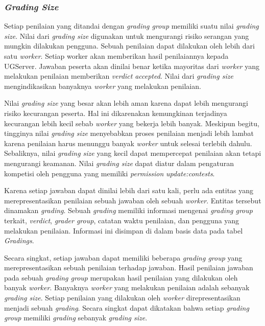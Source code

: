 \subsubsection{\textit{Grading Size}}

\par Setiap penilaian yang ditandai dengan \textit{grading group} memiliki suatu nilai \textit{grading size}. Nilai dari \textit{grading size} digunakan untuk mengurangi risiko serangan yang mungkin dilakukan pengguna. Sebuah penilaian dapat dilakukan oleh lebih dari satu \textit{worker}. Setiap worker akan memberikan hasil penilaiannya kepada UGServer. Jawaban peserta akan dinilai benar ketika mayoritas dari \textit{worker} yang melakukan penilaian memberikan \textit{verdict} \textit{accepted}. Nilai dari \textit{grading size} mengindikasikan banyaknya \textit{worker} yang melakukan penilaian.

\par Nilai \textit{grading size} yang besar akan lebih aman karena dapat lebih mengurangi risiko kecurangan peserta. Hal ini dikarenakan kemungkinan terjadinya kecurangan lebih kecil sebab \textit{worker} yang bekerja lebih banyak. Meskipun begitu, tingginya nilai \textit{grading size} menyebabkan proses penilaian menjadi lebih lambat karena penilaian harus menunggu banyak \textit{worker} untuk selesai terlebih dahulu. Sebaliknya, nilai \textit{grading size} yang kecil dapat mempercepat penilaian akan tetapi mengurangi keamanan. Nilai \textit{grading size} dapat diatur dalam pengaturan kompetisi oleh pengguna yang memiliki \textit{permission} \textit{update:contests}.

\par Karena setiap jawaban dapat dinilai lebih dari satu kali, perlu ada entitas yang merepresentasikan penilaian sebuah jawaban oleh sebuah \textit{worker}. Entitas tersebut dinamakan \textit{grading}. Sebuah \textit{grading} memiliki informasi mengenai \textit{grading group} terkait, \textit{verdict}, \textit{grader group}, catatan waktu penilaian, dan pengguna yang melakukan penilaian. Informasi ini disimpan di dalam basis data pada tabel \textit{Gradings}.

\par Secara singkat, setiap jawaban dapat memiliki beberapa \textit{grading group} yang merepresentasikan sebuah penilaian terhadap jawaban. Hasil penilaian jawaban pada sebuah \textit{grading group} merupakan hasil penilaian yang dilakukan oleh banyak \textit{worker}. Banyaknya \textit{worker} yang melakukan penilaian adalah sebanyak \textit{grading size}. Setiap penilaian yang dilakukan oleh \textit{worker} direpresentasikan menjadi sebuah \textit{grading}. Secara singkat dapat dikatakan bahwa setiap \textit{grading group} memiliki \textit{grading} sebanyak \textit{grading size}.

